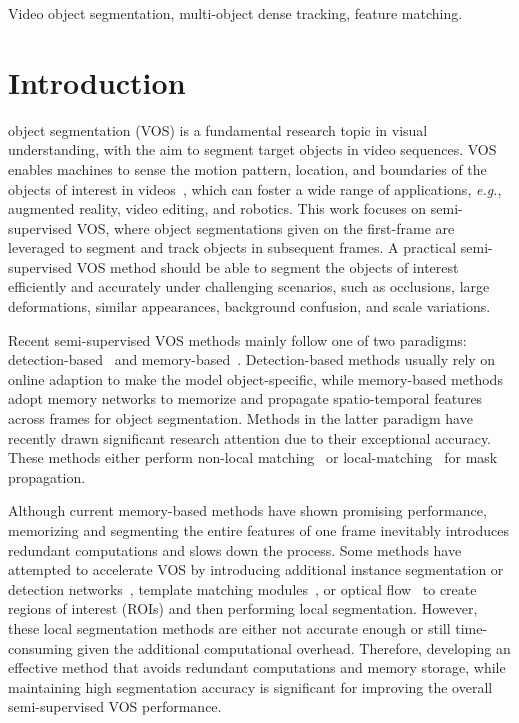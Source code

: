\documentclass[journal]{IEEEtran}
\def\eg{\emph{e.g.}}
\begin{document}
\begin{IEEEkeywords}
Video object segmentation, multi-object dense tracking, feature matching.
\end{IEEEkeywords}






\IEEEpeerreviewmaketitle



\section{Introduction}
 object segmentation (VOS) is a fundamental research topic in visual understanding, with the aim to segment target objects in video sequences. 
VOS enables machines to sense the motion pattern, location, and boundaries of the objects of interest in videos~\cite{MATNet}, which can foster a wide range of applications, \eg, augmented reality, video editing, and robotics. This work focuses on semi-supervised VOS, where object segmentations given on the first-frame are leveraged to segment and track objects in subsequent frames. A practical semi-supervised VOS method should be able to segment the objects of interest efficiently and accurately under challenging scenarios, such as occlusions, large deformations, similar appearances, background confusion, and scale variations.

Recent semi-supervised VOS methods mainly follow one of two paradigms: detection-based~\cite{OSVOS,OnAVOS,E_OSVOS} and memory-based~\cite{STM,CFBI,AOT,STCN}. Detection-based methods usually rely on online adaption to make the model object-specific, while memory-based methods adopt memory networks to memorize and propagate spatio-temporal features across frames for object segmentation. Methods in the latter paradigm have recently drawn significant research attention due to their exceptional accuracy. These methods either perform non-local matching~\cite{STM,STCN} or local-matching~\cite{MAST,MAMP} for mask propagation.

Although current memory-based methods have shown promising performance, memorizing and segmenting the entire features of one frame inevitably introduces redundant computations and slows down the process. Some methods have attempted to accelerate VOS by introducing additional instance segmentation or detection networks~\cite{DMN-AOA,TAN_DTTM}, template matching modules~\cite{SiamMask,SAT,FAVOS}, or optical flow~\cite{RMNet} to create regions of interest (ROIs) and then performing local segmentation. However, these local segmentation methods are either not accurate enough or still time-consuming given the additional computational overhead. Therefore, developing an effective method that avoids redundant computations and memory storage, while maintaining high segmentation accuracy is significant for improving the overall semi-supervised VOS performance.
\end{document}

